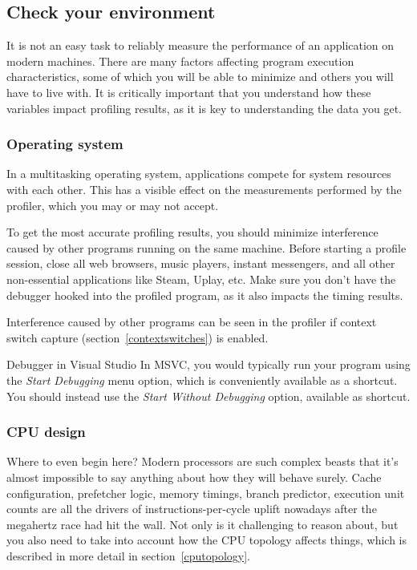 \documentclass[hidelinks,titlepage,a4paper,twoside]{article}
\begin{document}
\subsection{Check your environment}

It is not an easy task to reliably measure the performance of an application on modern machines. There are many factors affecting program execution characteristics, some of which you will be able to minimize and others you will have to live with. It is critically important that you understand how these variables impact profiling results, as it is key to understanding the data you get.

\subsubsection{Operating system}
\label{checkenvironmentos}

In a multitasking operating system, applications compete for system resources with each other. This has a visible effect on the measurements performed by the profiler, which you may or may not accept.

To get the most accurate profiling results, you should minimize interference caused by other programs running on the same machine. Before starting a profile session, close all web browsers, music players, instant messengers, and all other non-essential applications like Steam, Uplay, etc. Make sure you don't have the debugger hooked into the profiled program, as it also impacts the timing results.

Interference caused by other programs can be seen in the profiler if context switch capture (section~\ref{contextswitches}) is enabled.

\begin{bclogo}[
noborder=true,
couleur=black!5,
logo=\bclampe
]{Debugger in Visual Studio}
In MSVC, you would typically run your program using the \emph{Start Debugging} menu option, which is conveniently available as a  shortcut. You should instead use the \emph{Start Without Debugging} option, available as  shortcut.
\end{bclogo}

\subsubsection{CPU design}
\label{checkenvironmentcpu}

Where to even begin here? Modern processors are such complex beasts that it's almost impossible to say anything about how they will behave surely. Cache configuration, prefetcher logic, memory timings, branch predictor, execution unit counts are all the drivers of instructions-per-cycle uplift nowadays after the megahertz race had hit the wall. Not only is it challenging to reason about, but you also need to take into account how the CPU topology affects things, which is described in more detail in section~\ref{cputopology}.
\end{document}
